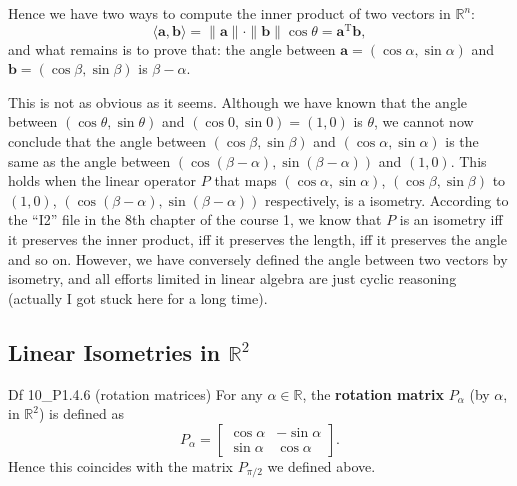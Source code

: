 \documentclass{article}
\begin{document}
Hence we have two ways to compute the inner product of two vectors in $\mathbb{R}^n$:
$$ \langle \pmb{a}, \pmb{b} \rangle = \|\pmb{a}\| \cdot \|\pmb{b}\| \cos \theta = \pmb{a}^\mathrm{T} \pmb{b}, $$
and what remains is to prove that: the angle between $\pmb{a} = (\cos\alpha, \sin\alpha)$ and $\pmb{b} = (\cos\beta, \sin\beta)$ is $\beta - \alpha$.

This is not as obvious as it seems. Although we have known that \textcolor{Th}{the angle between $(\cos\theta, \sin\theta)$ and $(\cos 0, \sin 0) = (1, 0)$ is $\theta$}, we cannot now conclude that the angle between $(\cos\beta, \sin\beta)$ and $(\cos\alpha, \sin\alpha)$ is the same as the angle between $(\cos(\beta-\alpha), \sin(\beta-\alpha))$ and $(1, 0)$. This holds when the linear operator $P$ that maps $(\cos\alpha, \sin\alpha)$, $(\cos\beta, \sin\beta)$ to $(1, 0)$, $(\cos(\beta-\alpha), \sin(\beta-\alpha))$ respectively, is a isometry. According to the ``I2'' file in the 8th chapter of the course 1, we know that $P$ is an isometry iff it preserves the inner product, iff it preserves the length, iff it preserves the angle and so on. However, we have conversely defined the angle between two vectors by isometry, and all efforts limited in linear algebra are just cyclic reasoning (actually I got stuck here for a long time).

\subsection{Linear Isometries in $\mathbb{R}^2$}

\begin{Df}{Df 10\_P1.4.6 (rotation matrices)}
    For any $\alpha\in\mathbb{R}$, the \textbf{rotation matrix} $P_\alpha$ (by $\alpha$, in $\mathbb{R}^2$) is defined as
    $$ P_\alpha = \begin{bmatrix}
        \cos\alpha & -\sin\alpha \\
        \sin\alpha & \cos\alpha
    \end{bmatrix}. $$
    \textcolor{Th}{Hence this coincides with the matrix $P_{\pi/2}$ we defined above}.
\end{Df}
\end{document}
